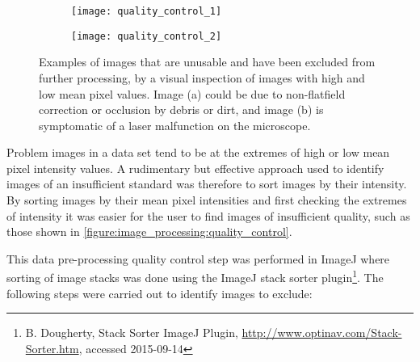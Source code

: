 \begin{figure}[htbp]\centering
	\begin{subfigure}[b]{0.49\linewidth} %
		\centering
		\texttt{[image: quality\_control\_1]}
		\caption{}
		\label{figure:image_processing:quality_control_1}
		\vspace{1ex} \end{subfigure} \begin{subfigure}[b]{0.49\linewidth} %
		\centering
		\texttt{[image: quality\_control\_2]}
		\caption{}
		\label{figure:image_processing:quality_control_2}
		\vspace{1ex}
	\end{subfigure}
\caption[Examples of images excluded from high-throughput analysis]{Examples of images that are unusable and have been excluded from further processing, by a visual inspection of images with high and low mean pixel values. Image (a) could be due to non-flatfield correction or occlusion by debris or dirt, and image (b) is symptomatic of a laser malfunction on the microscope.}
\label{figure:image_processing:quality_control}
\end{figure}

Problem images in a data set tend to be at the extremes of high or low mean pixel intensity values. A rudimentary but effective approach used to identify images of an insufficient standard was therefore to sort images by their intensity. By sorting images by their mean pixel intensities and first checking the extremes of intensity it was easier for the user to find images of insufficient quality, such as those shown in \autoref{figure:image_processing:quality_control}.

This data pre-processing quality control step was performed in ImageJ where sorting of image stacks was done using the ImageJ stack sorter plugin\footnote{B. Dougherty, Stack Sorter ImageJ Plugin, \url{http://www.optinav.com/Stack-Sorter.htm}, accessed 2015-09-14}. The following steps were carried out to identify images to exclude:

